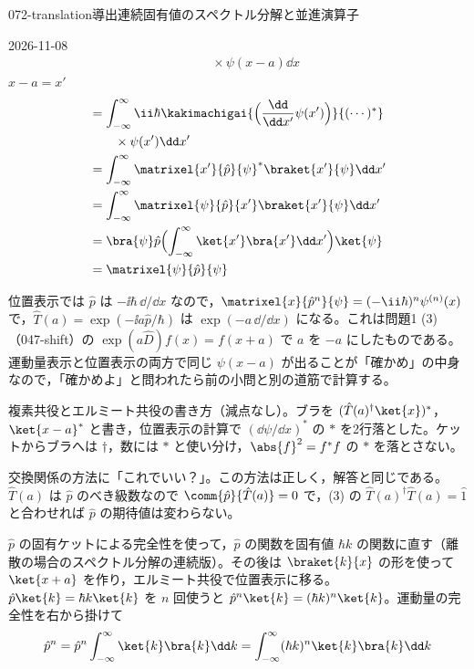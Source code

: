 \documentclass[uplatex,dvipdfmx,a4paper,11pt]{jsarticle}
\begin{document}
\begin{mondai}{072-translation}{導出}{連続固有値のスペクトル分解と並進演算子}
\begin{kotaeutsushi}{2026-11-08}
\begin{align*}
&\qquad\times\psi(x-a)\dd x
\end{align*}
$x-a=x'$
\begin{align*}
&=\int_{-\infty}^{\infty}\ii\hbar\kakimachigai{\Bigl(\frac{\dd}{\dd x'}\psi(x')\Bigr)}{(\cdots)^{*}}\\
&\qquad\times\psi(x')\dd x'\\
&=\int_{-\infty}^{\infty}\matrixel{x'}{\hat{p}}{\psi}^{*}\braket{x'}{\psi}\dd x'\\
&=\int_{-\infty}^{\infty}\matrixel{\psi}{\hat{p}}{x'}\braket{x'}{\psi}\dd x'\\
&=\bra{\psi}\hat{p}\Bigl(\int_{-\infty}^{\infty}\ket{x'}\bra{x'}\dd x'\Bigr)\ket{\psi}\\
&=\matrixel{\psi}{\hat{p}}{\psi}
\end{align*}
\end{kotaeutsushi}
\begin{kizuki}
\item 位置表示では $\hat{p}$ は $-\ii\hbar\,\dd/\dd x$ なので，$\matrixel{x}{\hat{p}^{n}}{\psi}=(-\ii\hbar)^{n}\psi^{(n)}(x)$ で，$\hat{T}(a)=\exp(-\ii a\hat{p}/\hbar)$ は $\exp(-a\,\dd/\dd x)$ になる。これは問題1 (3)（047-shift）の $\exp(a\hat{D})f(x)=f(x+a)$ で $a$ を $-a$ にしたものである。運動量表示と位置表示の両方で同じ $\psi(x-a)$ が出ることが「確かめ」の中身なので，「確かめよ」と問われたら前の小問と別の道筋で計算する。
\item {} 複素共役とエルミート共役の書き方（減点なし）。ブラを $(\hat{T}(a)^{\dagger}\ket{x})^{*}$，$\ket{x-a}^{*}$ と書き，位置表示の計算で $(\dd\psi/\dd x)^{*}$ の $*$ を2行落とした。ケットからブラへは $\dagger$，数には $*$ と使い分け，$\abs{f}^{2}=f^{*}f$ の $*$ を落とさない。
\item \jibunmemo 交換関係の方法に「これでいい？」。この方法は正しく，解答と同じである。$\hat{T}(a)$ は $\hat{p}$ のべき級数なので $\comm{\hat{p}}{\hat{T}(a)}=0$ で，(3) の $\hat{T}(a)^{\dagger}\hat{T}(a)=\hat{1}$ と合わせれば $\hat{p}$ の期待値は変わらない。
\end{kizuki}
\begin{tadashii}
\houshin $\hat{p}$ の固有ケットによる完全性を使って，$\hat{p}$ の関数を固有値 $\hbar k$ の関数に直す（離散の場合のスペクトル分解の連続版）。その後は $\braket{k}{x}$ の形を使って $\ket{x+a}$ を作り，エルミート共役で位置表示に移る。
\keisan {} $\hat{p}\ket{k}=\hbar k\ket{k}$ を $n$ 回使うと $\hat{p}^{n}\ket{k}=(\hbar k)^{n}\ket{k}$。運動量の完全性を右から掛けて
\[ \hat{p}^{n}=\hat{p}^{n}\int_{-\infty}^{\infty}\ket{k}\bra{k}\dd k=\int_{-\infty}^{\infty}(\hbar k)^{n}\ket{k}\bra{k}\dd k \]

\end{tadashii}
\end{mondai}
\end{document}
